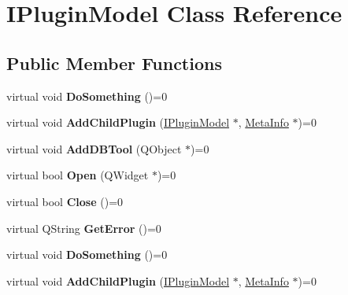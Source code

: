 \hypertarget{class_i_plugin_model}{}\section{I\+Plugin\+Model Class Reference}
\label{class_i_plugin_model}
\subsection*{Public Member Functions}
\begin{DoxyCompactItemize}
\item 
\mbox{\label{class_i_plugin_model_a377627e683f892ffda2c6225d975251b}} 
virtual void {\bfseries Do\+Something} ()=0
\item 
\mbox{\label{class_i_plugin_model_aff406b0571f6dc77488c315e0df0f563}} 
virtual void {\bfseries Add\+Child\+Plugin} (\hyperlink{class_i_plugin_model}{I\+Plugin\+Model} $\ast$, \hyperlink{struct_meta_info}{Meta\+Info} $\ast$)=0
\item 
\mbox{\label{class_i_plugin_model_a2db1262756c4a587fd6cd2d7191841fb}} 
virtual void {\bfseries Add\+D\+B\+Tool} (Q\+Object $\ast$)=0
\item 
\mbox{\label{class_i_plugin_model_ac1c51202f69db707ca56e8f3c78ce163}} 
virtual bool {\bfseries Open} (Q\+Widget $\ast$)=0
\item 
\mbox{\label{class_i_plugin_model_a3f9ce2298f73283fec68fc908db14e57}} 
virtual bool {\bfseries Close} ()=0
\item 
\mbox{\label{class_i_plugin_model_ad42778c15ce3e8fdb9524a6dfd61792a}} 
virtual Q\+String {\bfseries Get\+Error} ()=0
\item 
\mbox{\label{class_i_plugin_model_a377627e683f892ffda2c6225d975251b}} 
virtual void {\bfseries Do\+Something} ()=0
\item 
\mbox{\label{class_i_plugin_model_aff406b0571f6dc77488c315e0df0f563}} 
virtual void {\bfseries Add\+Child\+Plugin} (\hyperlink{class_i_plugin_model}{I\+Plugin\+Model} $\ast$, \hyperlink{struct_meta_info}{Meta\+Info} $\ast$)=0

\end{DoxyCompactItemize}
